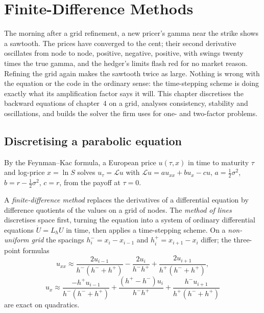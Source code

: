 \chapter{Finite-Difference Methods}\label{ch:qm:finite-difference-methods}

The morning after a grid refinement, a new pricer's gamma near the strike shows a sawtooth. The prices have converged to the cent; their second derivative oscillates from node to node,
positive, negative, positive, with swings twenty times the true gamma, and the hedger's limits flash red for no market reason. Refining the grid again makes the sawtooth twice as large. Nothing
is wrong with the equation or the code in the ordinary sense: the time-stepping scheme is doing exactly what its amplification factor says it will. This chapter discretises the backward equations
of chapter~4 on a grid, analyses consistency, stability and oscillations, and builds the solver the firm uses for one- and two-factor problems.

\section{Discretising a parabolic equation}

By the Feynman--Kac formula, a European price $u(\tau, x)$ in time to maturity $\tau$ and log-price $x = \ln S$ solves $u_\tau = \mathcal Lu$ with $\mathcal Lu = au_{xx} + bu_x - cu$, $a =
\frac12\sigma^2$, $b = r - \frac12\sigma^2$, $c = r$, from the payoff at $\tau = 0$.

\begin{definition}\label{def:qm:finite-difference-methods:fd}
A \emph{finite-difference method} replaces the derivatives of a differential equation by difference quotients of the values on a grid of nodes. The \emph{method of
lines} discretises space first, turning the equation into a system of ordinary differential equations $\dot U = L_hU$ in time, then applies a time-stepping scheme. On a
\emph{non-uniform grid} the spacings $h_i^- = x_i - x_{i-1}$ and $h_i^+ = x_{i+1} - x_i$ differ; the three-point formulas
\[u_{xx} \approx \frac{2u_{i-1}}{h^-(h^- + h^+)} - \frac{2u_i}{h^-h^+} + \frac{2u_{i+1}}{h^+(h^- + h^+)},\]
\[u_x \approx \frac{-h^+u_{i-1}}{h^-(h^- + h^+)} + \frac{(h^+ - h^-)u_i}{h^-h^+} + \frac{h^-u_{i+1}}{h^+(h^- + h^+)}\]
are exact on quadratics.
\end{definition}

